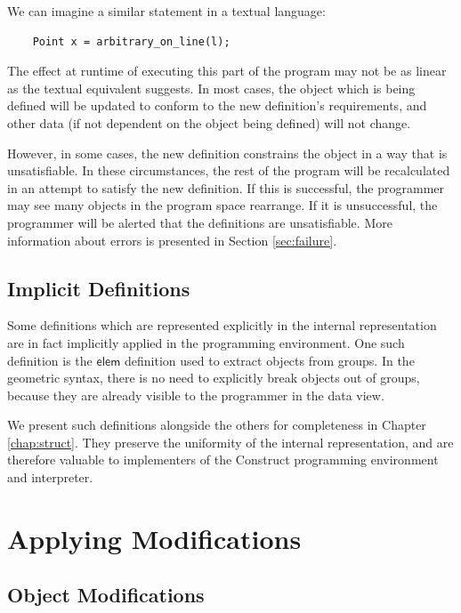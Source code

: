 \documentclass[twoside,openright,11pt]{report}
\begin{document}
We can imagine a similar statement in a textual language:

\begin{verbatim}
    Point x = arbitrary_on_line(l);
\end{verbatim}

The effect at runtime of executing this part of the program may not be as linear as the textual equivalent suggests.
In most cases, the object which is being defined will be updated to conform to the new definition's requirements, and other data (if not dependent on the object being defined) will not change.

However, in some cases, the new definition constrains the object in a way that is unsatisfiable. 
In these circumstances, the rest of the program will be recalculated in an attempt to satisfy the new definition. 
If this is successful, the programmer may see many objects in the program space rearrange. 
If it is unsuccessful, the programmer will be alerted that the definitions are unsatisfiable.
More information about errors is presented in Section \ref{sec:failure}.

\subsection{Implicit Definitions}
\label{subsec:implicit-def}

Some definitions which are represented explicitly in the internal representation are in fact implicitly applied in the programming environment.
One such definition is the $\mathsf{elem}$ definition used to extract objects from groups. 
In the geometric syntax, there is no need to explicitly break objects out of groups, because they are already visible to the programmer in the data view.

We present such definitions alongside the others for completeness in Chapter \ref{chap:struct}.
They preserve the uniformity of the internal representation, and are therefore valuable to implementers of the Construct programming environment and interpreter.

\section{Applying Modifications}
\label{sec:applymod}

\subsection{Object Modifications}
\label{subsec:mod-obj}
\end{document}

